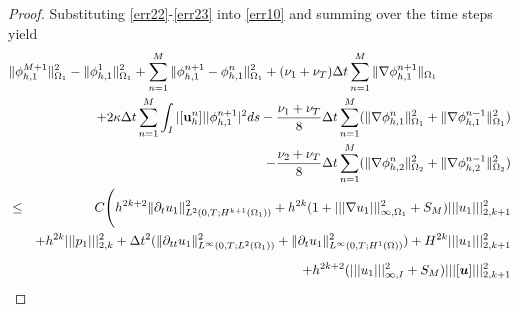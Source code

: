 \documentclass[10pt]{article}%
\numberwithin{equation}{section}
\begin{document}
\begin{proof}
	Substituting  \eqref{err22}-\eqref{err23} into \eqref{err10} and summing over the time steps yield
		\begin{eqnarray}
	\lefteqn{{\|\phi_{h,1}^{M+1}\|_{\Omega_1}^2-\|\phi_{h,1}^{1}\|_{\Omega_1}^2} +\sum_{n=1}^{M}\|\phi_{h,1}^{n+1}-\phi_{h,1}^{n}\|_{\Omega_1}^2 +(\nu_1+\nu_T)\Delta t\sum_{n=1}^{M}\|\nabla  \phi_{h,1}^{n+1}\|_{\Omega_1}}
	\nonumber\\&&+2\kappa\Delta t \sum_{n=1}^{M}\int_{I}|[{\bf u}_h^n]|  |\phi_{h,1}^{n+1}|^2ds-\frac{{ \nu_1+\nu_T}}{8}\Delta t\sum_{n=1}^{M}(\|\nabla{\bf \phi}_{h,1}^n\|^2_{\Omega_1}+\|\nabla {\bf \phi}_{h,1}^{n-1}\|^2_{\Omega_1})\nonumber\allowdisplaybreaks\\&&-\frac{{ \nu_2+\nu_T}}{8}\Delta t\sum_{n=1}^{M}(\|\nabla{\bf \phi}_{h,2}^n\|^2_{\Omega_2}+\|\nabla {\bf \phi}_{h,2}^{n-1}\|^2_{\Omega_2})\nonumber\allowdisplaybreaks\\&\leq& C\Bigg(h^{2k+2}\|\partial_{t}u_1 \|_{L^2(0,T;H^{k+1}(\Omega_1))}^2+h^{2k}(1+|||\nabla u_{1}|||_{\infty,\Omega_1}^2+S_M)|||u_1|||_{2,k+1}^2\nonumber\\&&+h^{2k}|||p_1|||_{2,k}^2+\Delta t^2(\|\partial_{tt}u_1\|_{L^\infty(0,T;L^2(\Omega_1))}^2+\|\partial_t u_1\|_{L^{\infty}(0,T;H^1(\Omega))}^2)+H^{2k}|||u_1|||_{2,k+1}^2\nonumber\\[5pt]&&+h^{2k+2}(|||u_1|||_{\infty,I}^2+S_M)|||[\boldsymbol{u}]|||^2_{2,k+1}

\end{eqnarray}
\end{proof}
\end{document}
